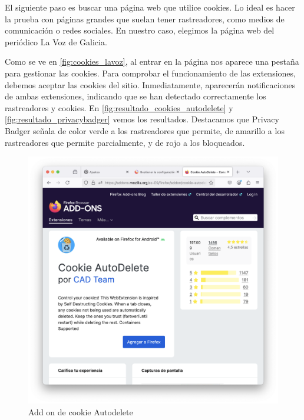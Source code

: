 El siguiente paso es buscar una página web que utilice cookies. Lo ideal es hacer la prueba con páginas grandes que suelan tener rastreadores, como medios de comunicación o redes sociales. En nuestro caso, elegimos la página web del periódico La Voz de Galicia.  

Como se ve en \ref{fig:cookies_lavoz}, al entrar en la página nos aparece una pestaña para gestionar las cookies. Para comprobar el funcionamiento de las extensiones, debemos aceptar las cookies del sitio. Inmediatamente, aparecerán notificaciones de ambas extensiones, indicando que se han detectado correctamente los rastreadores y cookies. En \ref{fig:resultado_cookies_autodelete} y \ref{fig:resultado_privacybadger} vemos los resultados. Destacamos que Privacy Badger señala de color verde a los rastreadores que permite, de amarillo a los rastreadores que permite parcialmente, y de rojo a los bloqueados. 

\begin{figure}[H]   
    \includegraphics[width=\textwidth]{addon_cookie_autodelete.png}
    \caption{Add on de cookie Autodelete}
    \label{fig:addon_cookie_autodelete}
\end{figure}

